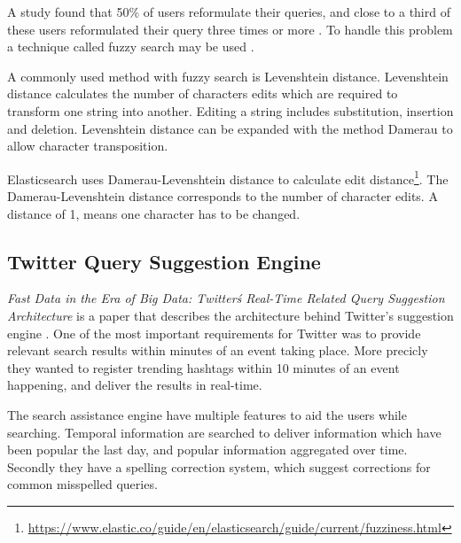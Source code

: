 A study found that 50\% of users reformulate their queries, and close to a third of these users reformulated their query three times or more \cite{query-reformulate}.
To handle this problem a technique called fuzzy search may be used \cite{fuzzy-search}.

A commonly used method with fuzzy search is Levenshtein distance.
Levenshtein distance calculates the number of characters edits which are required to transform one string into another.
Editing a string includes substitution, insertion and deletion.
Levenshtein distance can be expanded with the method Damerau to allow character transposition.

Elasticsearch uses Damerau-Levenshtein distance to calculate edit distance\footnote{\url{https://www.elastic.co/guide/en/elasticsearch/guide/current/fuzziness.html}}.
The Damerau-Levenshtein distance corresponds to the number of character edits.
A distance of 1, means one character has to be changed.

\subsection{Twitter Query Suggestion Engine}
\textit{Fast Data in the Era of Big Data: Twitter\'s Real-Time Related Query Suggestion Architecture} is a paper that describes the architecture behind Twitter's suggestion engine \cite{twitter-suggestion}.
One of the most important requirements for Twitter was to provide relevant search results within minutes of an event taking place.
More precicly they wanted to register trending hashtags within 10 minutes of an event happening, and deliver the results in real-time.

The search assistance engine have multiple features to aid the users while searching.
Temporal information are searched to deliver information which have been popular the last day, and popular information aggregated over time.
Secondly they have a spelling correction system, which suggest corrections for common misspelled queries.
